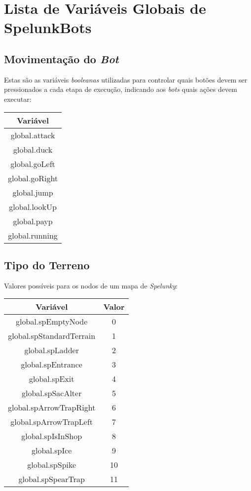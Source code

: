 \chapter{\label{appendix:spelunkbots-variables}Lista de Variáveis Globais
de SpelunkBots}

\section{Movimentação do \textit{Bot}}
Estas são as variáveis \textit{booleanas} utilizadas para controlar quais botões
devem ser pressionados a cada etapa de execução, indicando aos \textit{bots}
quais ações devem executar:

\begin{center}
    \begin{tabular}{ |c| }
        \hline
        \textbf{Variável} \\ \hline
        global.attack \\ \hline
        global.duck \\ \hline
        global.goLeft \\ \hline
        global.goRight \\ \hline
        global.jump \\ \hline
        global.lookUp \\ \hline
        global.payp \\ \hline
        global.running \\ \hline
    \end{tabular}
\end{center}

\section{Tipo do Terreno}
Valores possíveis para os nodos de um mapa de \textit{Spelunky}:

\begin{center}
    \begin{tabular}{ |c|c| }
        \hline
        \textbf{Variável} & \textbf{Valor} \\ \hline
        global.spEmptyNode & 0 \\ \hline
        global.spStandardTerrain & 1 \\ \hline
        global.spLadder & 2 \\ \hline
        global.spEntrance & 3 \\ \hline
        global.spExit & 4 \\ \hline
        global.spSacAlter & 5 \\ \hline
        global.spArrowTrapRight & 6 \\ \hline
        global.spArrowTrapLeft & 7 \\ \hline
        global.spIsInShop & 8 \\ \hline
        global.spIce & 9 \\ \hline
        global.spSpike & 10 \\ \hline
        global.spSpearTrap & 11 \\ \hline
    \end{tabular}
\end{center}

